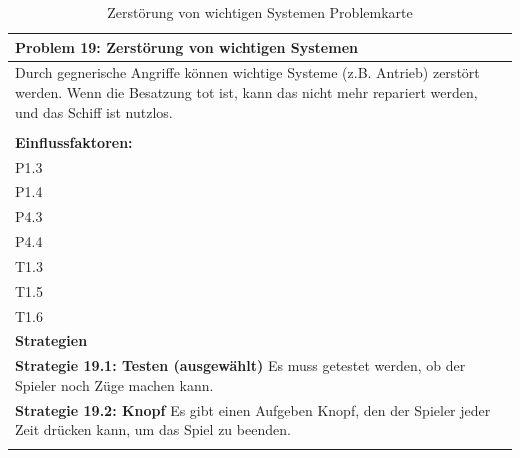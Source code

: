 \documentclass[fontsize=12pt,paper=a4,twoside]{scrartcl}
\begin{document}
\begin{table}[H]
    \centering
    \begin{tabular}{|p{15cm}|}
    \hline
          \textbf{Problem 19: Zerstörung von wichtigen Systemen}  \\ \hline
	Durch gegnerische Angriffe können wichtige Systeme (z.B. Antrieb) zerstört werden. Wenn die Besatzung tot ist, kann das nicht mehr repariert werden, und das Schiff ist nutzlos. \\
         \\ \hline
          \textbf{Einflussfaktoren: } \\
	P1.3 \\
	P1.4 \\
	P4.3 \\
	P4.4 \\
	T1.3 \\
	T1.5 \\
	T1.6 \\
          \hline
          \textbf{Strategien} \\ \hline
            {}          
           \label{strategie:19.1}     
          \textbf{Strategie 19.1: Testen (ausgewählt)} Es muss getestet werden, ob der Spieler noch Züge machen kann.  \\        
  {}          
           \label{strategie:19.2}              
          \textbf{Strategie 19.2: Knopf} Es gibt einen Aufgeben Knopf, den der Spieler jeder Zeit drücken kann, um das Spiel zu beenden.  \\
	 \\ \hline
    \end{tabular}

    \caption{Zerstörung von wichtigen Systemen Problemkarte}
    \label{tab:ProblemKarte19}
\end{table}
\end{document}
